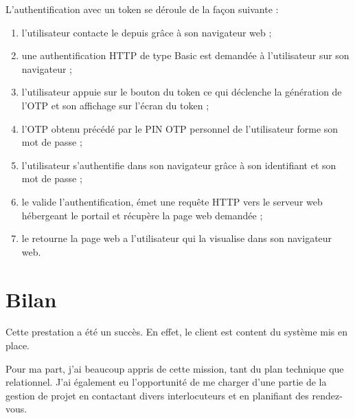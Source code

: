 L'authentification avec un token se déroule de la façon suivante :

\begin{enumerate}
	\item l'utilisateur contacte le \arp{} depuis \ainternet{} grâce à son navigateur web ;
	\item une authentification HTTP de type Basic est demandée à l'utilisateur sur son navigateur ;
	\item l'utilisateur appuie sur le bouton du token ce qui déclenche la génération de l'OTP et son affichage sur l'écran du token ;
	\item l'OTP obtenu précédé par le PIN OTP personnel de l'utilisateur forme son mot de passe ;
	\item l'utilisateur s'authentifie dans son navigateur grâce à son identifiant et son mot de passe ;
	\item le \arp{} valide l'authentification, émet une requête HTTP vers le serveur web hébergeant le portail \atypo{} et récupère la page web demandée ;
	\item le \arp{} retourne la page web a l'utilisateur qui la visualise dans son navigateur web.
\end{enumerate}


\section{Bilan}

Cette prestation a été un succès.
En effet, le client est content du système mis en place.

Pour ma part, j'ai beaucoup appris de cette mission, tant du plan technique que relationnel.
J'ai également eu l'opportunité de me charger d'une partie de la gestion de projet en contactant divers interlocuteurs et en planifiant des rendez-vous.

